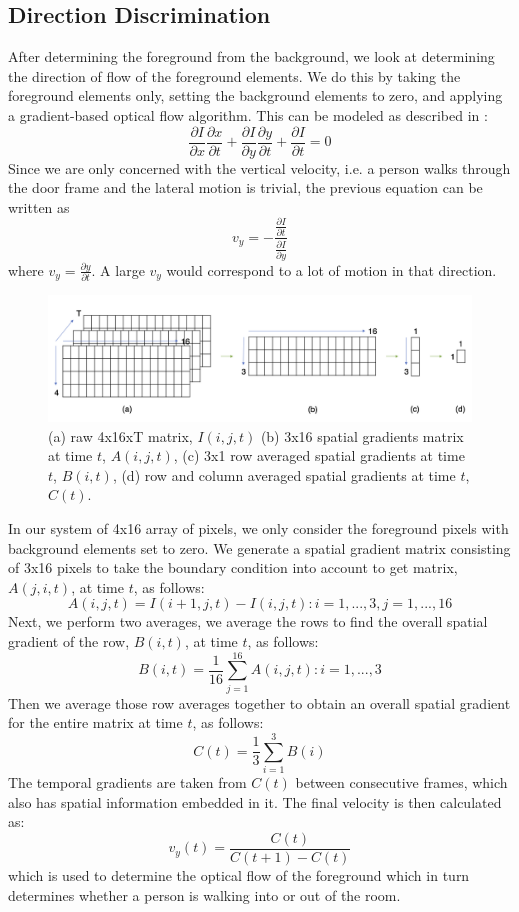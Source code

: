 \documentclass[12pt,oneside]{article} %
\begin{document}
\subsection{Direction Discrimination}
After determining the foreground from the background, we look at determining the direction of flow of the foreground elements. We do this by taking the foreground elements only, setting the background elements to zero, and applying a gradient-based optical flow algorithm. This can be modeled as described in \cite{Smith97}:
$$\frac{\partial I}{\partial x}\frac{\partial x}{\partial t}+\frac{\partial I}{\partial y}\frac{\partial y}{\partial t} + \frac{\partial I}{\partial t}=0$$
Since we are only concerned with the vertical velocity, i.e. a person walks through the door frame and the lateral motion is trivial, the previous equation can be written as
$$v_y = - \frac{\frac{\partial I}{\partial t}}{\frac{\partial I}{\partial y}}$$
where $v_y =  \frac{\partial y}{\partial t}$. A large $v_y $ would correspond to a lot of motion in that direction. 
\begin{figure}[!htb]
\centering
\includegraphics[scale=0.3]{images/matrix.png}
\caption{(a) raw 4x16xT matrix, $I(i,j,t)$ (b) 3x16 spatial gradients matrix at time $t$, $A(i,j,t)$, (c) 3x1 row averaged spatial gradients at time $t$, $B(i,t)$, (d) row and column averaged spatial gradients at time $t$, $C(t)$.}
\label{matrix}
\end{figure}
In our system of 4x16 array of pixels, we only consider the foreground pixels with background elements set to zero. We generate a spatial gradient matrix consisting of 3x16 pixels to take the boundary condition into account to get matrix, $A(j,i,t)$, at time $t$, as follows: $$A(i,j,t) = I(i+1,j,t) - I(i,j,t) : i = 1, . . ., 3, j = 1, . . ., 16$$ Next, we perform two averages, we average the rows to find the overall spatial gradient of the row, $B(i,t)$, at time $t$, as follows: $$B(i,t) = \frac{1}{16}\sum_{j=1}^{16}A(i,j,t) : i = 1, . . .,3$$ Then we average those row averages together to obtain an overall spatial gradient for the entire matrix at time $t$, as follows: $$C(t) = \frac{1}{3}\sum_{i=1}^{3}B(i)$$ The temporal gradients are taken from $C(t)$ between consecutive frames, which also has spatial information embedded in it. The final velocity is then calculated as: $$v_y(t) = \frac{C(t)}{C(t+1)-C(t)}$$ which is used to determine the optical flow of the foreground which in turn determines whether a person is walking into or out of the room. 
\end{document}
